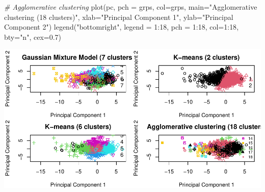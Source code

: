 \documentclass[
]{article}
\newenvironment{Shaded}{\begin{snugshade}}{\end{snugshade}}
\newcommand{\AttributeTok}[1]{\textcolor[rgb]{0.77,0.63,0.00}{#1}}
\newcommand{\CommentTok}[1]{\textcolor[rgb]{0.56,0.35,0.01}{\textit{#1}}}
\newcommand{\DecValTok}[1]{\textcolor[rgb]{0.00,0.00,0.81}{#1}}
\newcommand{\FloatTok}[1]{\textcolor[rgb]{0.00,0.00,0.81}{#1}}
\newcommand{\FunctionTok}[1]{\textcolor[rgb]{0.00,0.00,0.00}{#1}}
\newcommand{\NormalTok}[1]{#1}
\newcommand{\SpecialCharTok}[1]{\textcolor[rgb]{0.00,0.00,0.00}{#1}}
\newcommand{\StringTok}[1]{\textcolor[rgb]{0.31,0.60,0.02}{#1}}
\begin{document}
\begin{Shaded}
\begin{Highlighting}[]
\CommentTok{\# Agglomerative clustering}
\FunctionTok{plot}\NormalTok{(pc, }\AttributeTok{pch =}\NormalTok{ grps, }\AttributeTok{col=}\NormalTok{grps, }\AttributeTok{main=}\StringTok{"Agglomerative clustering (18 clusters)"}\NormalTok{, }
       \AttributeTok{xlab=}\StringTok{"Principal Component 1"}\NormalTok{, }\AttributeTok{ylab=}\StringTok{"Principal Component 2"}\NormalTok{)}
\FunctionTok{legend}\NormalTok{(}\StringTok{"bottomright"}\NormalTok{, }\AttributeTok{legend =} \DecValTok{1}\SpecialCharTok{:}\DecValTok{18}\NormalTok{, }\AttributeTok{pch =} \DecValTok{1}\SpecialCharTok{:}\DecValTok{18}\NormalTok{, }\AttributeTok{col=}\DecValTok{1}\SpecialCharTok{:}\DecValTok{18}\NormalTok{, }\AttributeTok{bty=}\StringTok{"n"}\NormalTok{, }\AttributeTok{cex=}\FloatTok{0.7}\NormalTok{)}
\end{Highlighting}
\end{Shaded}

\includegraphics{Influence_factors_files/figure-latex/3.11_ca_comparison_munic-1.pdf}
\end{document}
